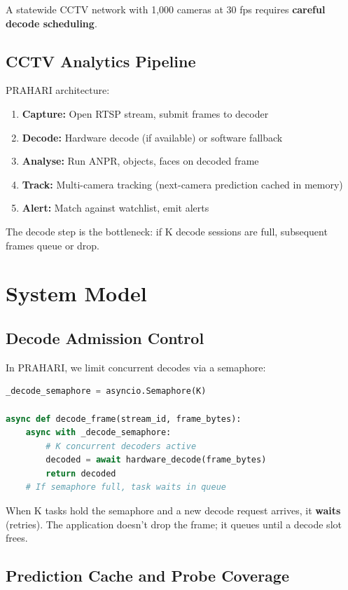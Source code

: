 \documentclass[sigconf,review]{acmart}
\begin{document}
A statewide CCTV network with 1,000 cameras at 30 fps requires \textbf{careful decode scheduling}.

\subsection{CCTV Analytics Pipeline}

PRAHARI architecture:
\begin{enumerate}
  \item \textbf{Capture:} Open RTSP stream, submit frames to decoder
  \item \textbf{Decode:} Hardware decode (if available) or software fallback
  \item \textbf{Analyse:} Run ANPR, objects, faces on decoded frame
  \item \textbf{Track:} Multi-camera tracking (next-camera prediction cached in memory)
  \item \textbf{Alert:} Match against watchlist, emit alerts
\end{enumerate}

The decode step is the bottleneck: if K decode sessions are full, subsequent frames queue or drop.

\section{System Model}

\subsection{Decode Admission Control}

In PRAHARI, we limit concurrent decodes via a semaphore:

\begin{lstlisting}[language=Python]
_decode_semaphore = asyncio.Semaphore(K)

async def decode_frame(stream_id, frame_bytes):
    async with _decode_semaphore:
        # K concurrent decoders active
        decoded = await hardware_decode(frame_bytes)
        return decoded
    # If semaphore full, task waits in queue
\end{lstlisting}

When K tasks hold the semaphore and a new decode request arrives, it \textbf{waits} (retries). The application
doesn't drop the frame; it queues until a decode slot frees.

\subsection{Prediction Cache and Probe Coverage}
\end{document}
